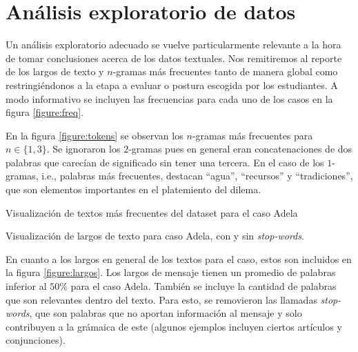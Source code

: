 \documentclass[
	spanish, %
	letterpaper, oneside
]{article}
\begin{document}
\section{Análisis exploratorio de datos}


Un análisis exploratorio adecuado se vuelve particularmente relevante a la hora de tomar conclusiones acerca de los datos textuales. Nos remitiremos al reporte de los largos de texto y $n$-gramas más frecuentes tanto de manera global como restringiéndonos a la etapa a evaluar o postura escogida por los estudiantes. A modo informativo se incluyen las frecuencias para cada uno de los casos en la figura \ref{figure:freq}.

\newp En la figura \ref{figure:tokens} se observan los $n$-gramas más frecuentes para $n \in \{ 1, 3 \}$. Se ignoraron los $2$-gramas pues en general eran concatenaciones de dos palabras que carecían de significado sin tener una tercera. En el caso de los $1$-gramas, i.e., palabras más frecuentes, destacan ``agua'', ``recursos'' y ``tradiciones'', que son elementos importantes en el platemiento del dilema.

\begin{images}[\label{figure:tokens}]{Visualización de textos más frecuentes del dataset para el caso Adela}
    \imagesnewline
\end{images}

\begin{images}[\label{figure:largos}]{Visualización de largos de texto para caso Adela, con y sin \textit{stop-words}.}
\end{images}


En cuanto a los largos en general de los textos para el caso, estos son incluidos en la figura \ref{figure:largos}. Los largos de mensaje tienen un promedio de palabras inferior al $50\%$ para el caso Adela. También se incluye la cantidad de palabras que son relevantes dentro del texto. Para esto, se removieron las llamadas \textit{stop-words}, que son palabras que no aportan información al mensaje y solo contribuyen a la grámaica de este (algunos ejemplos incluyen ciertos artículos y conjunciones). 
\end{document}
